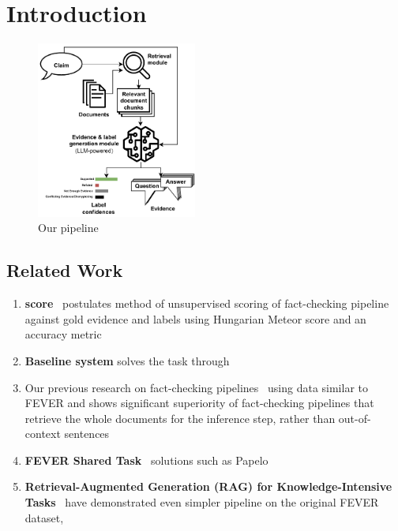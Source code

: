 
\section{Introduction}
\label{sec:introduction}

\begin{figure}[h]
    \centering
    \includegraphics[width=0.47\textwidth]{figures/pipeline.pdf}
    \caption{Our pipeline}
    \label{fig:pipeline}
\end{figure}

\subsection{Related Work}
\label{sec:relwork}
\begin{enumerate}
    \item \textbf{\averitec{} score}~\cite{averitec2024} postulates method of unsupervised scoring of fact-checking pipeline against gold evidence and labels using Hungarian Meteor score and an accuracy metric
    \item \textbf{Baseline \averitec{} system} solves the task through 
    \item Our previous research on fact-checking pipelines~\cite{Ullrich2023,drchal2023pipelinedatasetgenerationautomated} using data similar to FEVER and \averitec{} shows significant superiority of fact-checking pipelines that retrieve the whole documents for the inference step, rather than out-of-context sentences
    \item \textbf{FEVER Shared Task}~\cite{thorne-etal-2018-fact} solutions such as Papelo~\cite{}
    \item \textbf{Retrieval-Augmented Generation (RAG) for Knowledge-Intensive Tasks}~\cite{rag} have demonstrated even simpler pipeline on the original FEVER dataset, 
\end{enumerate}

